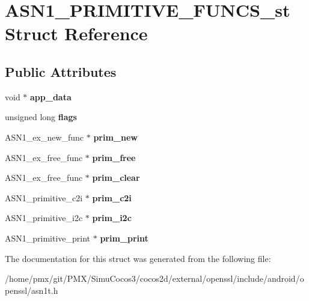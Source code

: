 \hypertarget{structASN1__PRIMITIVE__FUNCS__st}{}\section{A\+S\+N1\+\_\+\+P\+R\+I\+M\+I\+T\+I\+V\+E\+\_\+\+F\+U\+N\+C\+S\+\_\+st Struct Reference}
\label{structASN1__PRIMITIVE__FUNCS__st}
\subsection*{Public Attributes}
\begin{DoxyCompactItemize}
\item 
\mbox{\label{structASN1__PRIMITIVE__FUNCS__st_af4eee08216c2c931c753314cab246299}} 
void $\ast$ {\bfseries app\+\_\+data}
\item 
\mbox{\label{structASN1__PRIMITIVE__FUNCS__st_a9ea38cfb70abc1afd0fe8f272015737b}} 
unsigned long {\bfseries flags}
\item 
\mbox{\label{structASN1__PRIMITIVE__FUNCS__st_a5f912ee76299c4aa7ac938e52d143104}} 
A\+S\+N1\+\_\+ex\+\_\+new\+\_\+func $\ast$ {\bfseries prim\+\_\+new}
\item 
\mbox{\label{structASN1__PRIMITIVE__FUNCS__st_a5dac786c4df40f578e393a3cea32f524}} 
A\+S\+N1\+\_\+ex\+\_\+free\+\_\+func $\ast$ {\bfseries prim\+\_\+free}
\item 
\mbox{\label{structASN1__PRIMITIVE__FUNCS__st_a5826367de3de77e5410490208839d9f8}} 
A\+S\+N1\+\_\+ex\+\_\+free\+\_\+func $\ast$ {\bfseries prim\+\_\+clear}
\item 
\mbox{\label{structASN1__PRIMITIVE__FUNCS__st_aebfce381cc6eeb281cfd433513dd3ad0}} 
A\+S\+N1\+\_\+primitive\+\_\+c2i $\ast$ {\bfseries prim\+\_\+c2i}
\item 
\mbox{\label{structASN1__PRIMITIVE__FUNCS__st_ac58fdce92f613730a63b6c544305ad0d}} 
A\+S\+N1\+\_\+primitive\+\_\+i2c $\ast$ {\bfseries prim\+\_\+i2c}
\item 
\mbox{\label{structASN1__PRIMITIVE__FUNCS__st_af2b4c32907a8e20d81519452d2c2f12a}} 
A\+S\+N1\+\_\+primitive\+\_\+print $\ast$ {\bfseries prim\+\_\+print}
\end{DoxyCompactItemize}


The documentation for this struct was generated from the following file\+:\begin{DoxyCompactItemize}
\item 
/home/pmx/git/\+P\+M\+X/\+Simu\+Cocos3/cocos2d/external/openssl/include/android/openssl/asn1t.\+h\end{DoxyCompactItemize}
